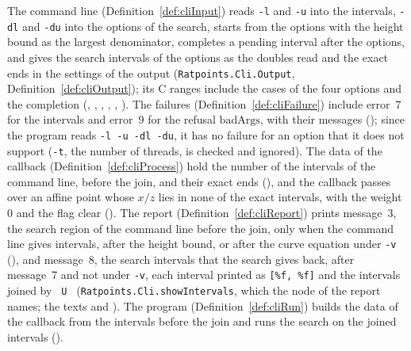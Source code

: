 The command line (Definition~\ref{def:cliInput}) reads \verb|-l| and \verb|-u| into the intervals,
\verb|-dl| and \verb|-du| into the options of the search, starts from the options with the height
bound as the largest denominator, completes a pending interval after the options, and gives the
search intervals of the options as the doubles read and the exact ends in the settings of the output
(\verb|Ratpoints.Cli.Output|, Definition~\ref{def:cliOutput}); its C ranges include the cases of the
four options and the completion (, ,
, , ,
). The failures (Definition~\ref{def:cliFailure}) include error~7 for the
intervals and error~9 for the refusal $\mathrm{badArgs}$, with their messages
(); since the program reads \verb|-l -u -dl -du|, it has no failure for
an option that it does not support (\verb|-t|, the number of threads, is checked and ignored). The
data of the callback (Definition~\ref{def:cliProcess}) hold the number of the intervals of the
command line, before the join, and their exact ends (), and the callback
passes over an affine point whose $x/z$ lies in none of the exact intervals, with the weight $0$ and
the flag clear (). The report (Definition~\ref{def:cliReport}) prints
message~3, the search region of the command line before the join, only when the command line gives
intervals, after the height bound, or after the curve equation under \verb|-v|
(), and message~8, the search intervals that the search gives back, after
message~7 and not under \verb|-v|, each interval printed as \verb|[%f, %f]| and the intervals joined
by \verb| U | (\verb|Ratpoints.Cli.showIntervals|, which the node of the report names; the texts
 and ). The program
(Definition~\ref{def:cliRun}) builds the data of the callback from the intervals before the join and
runs the search on the joined intervals ().

